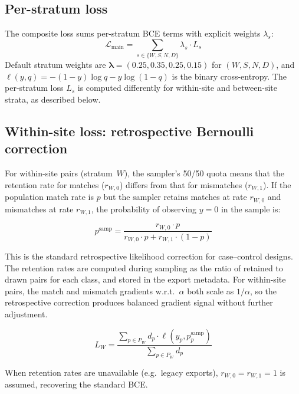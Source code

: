 \documentclass{article}
\begin{document}
\subsection{Per-stratum loss}

The composite loss sums per-stratum BCE terms with explicit weights $\lambda_s$:
\begin{equation}
    \mathcal{L}_{\text{main}} = \sum_{s \in \{W,S,N,D\}} \lambda_s \cdot L_s
    \label{eq:composite-loss}
\end{equation}
Default stratum weights are $\bm{\lambda} = (0.25, 0.35, 0.25, 0.15)$ for $(W, S, N, D)$, and $\ell(y, q) = -(1-y)\log q - y\log(1-q)$ is the binary cross-entropy. The per-stratum loss $L_s$ is computed differently for within-site and between-site strata, as described below.

\subsection{Within-site loss: retrospective Bernoulli correction}

For within-site pairs (stratum~$W$), the sampler's 50/50 quota means that the retention rate for matches ($r_{W,0}$) differs from that for mismatches ($r_{W,1}$). If the population match rate is $p$ but the sampler retains matches at rate $r_{W,0}$ and mismatches at rate $r_{W,1}$, the probability of observing $y=0$ in the sample is:

\begin{equation}
    p^{\text{samp}} = \frac{r_{W,0} \cdot p}{r_{W,0} \cdot p + r_{W,1} \cdot (1-p)}
    \label{eq:retro-correction}
\end{equation}

This is the standard retrospective likelihood correction for case--control designs. The retention rates are computed during sampling as the ratio of retained to drawn pairs for each class, and stored in the export metadata. For within-site pairs, the match and mismatch gradients w.r.t.\ $\alpha$ both scale as $1/\alpha$, so the retrospective correction produces balanced gradient signal without further adjustment.

\begin{equation}
    L_W = \frac{\sum_{p \in P_W} d_p \cdot \ell(y_p, p_p^{\text{samp}})}{\sum_{p \in P_W} d_p}
\end{equation}

When retention rates are unavailable (e.g.\ legacy exports), $r_{W,0} = r_{W,1} = 1$ is assumed, recovering the standard BCE.
\end{document}
